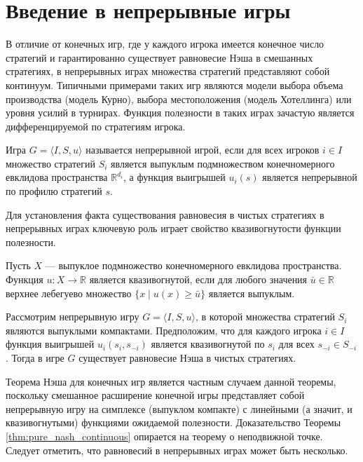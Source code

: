 \section{Введение в непрерывные игры}

В отличие от конечных игр, где у каждого игрока имеется конечное число стратегий и гарантированно существует равновесие Нэша в смешанных стратегиях, в непрерывных играх множества стратегий представляют собой континуум. Типичными примерами таких игр являются модели выбора объема производства (модель Курно), выбора местоположения (модель Хотеллинга) или уровня усилий в турнирах. Функция полезности в таких играх зачастую является дифференцируемой по стратегиям игрока.

\begin{definition}
Игра $G = \langle I, S, u \rangle$ называется непрерывной игрой, если для всех игроков $i \in I$ множество стратегий $S_i$ является выпуклым подмножеством конечномерного евклидова пространства $\mathbb{R}^{d_i}$, а функция выигрышей $u_i(s)$ является непрерывной по профилю стратегий $s$.
\end{definition}

Для установления факта существования равновесия в чистых стратегиях в непрерывных играх ключевую роль играет свойство квазивогнутости функции полезности.

\begin{definition}
Пусть $X$ — выпуклое подмножество конечномерного евклидова пространства. Функция $u : X \to \mathbb{R}$ является квазивогнутой, если для любого значения $\bar{u} \in \mathbb{R}$ верхнее лебегуево множество $\{x \mid u(x) \ge \bar{u}\}$ является выпуклым.
\end{definition}

\begin{theorem}\label{thm:pure_nash_continuous}
Рассмотрим непрерывную игру $G = \langle I, S, u \rangle$, в которой множества стратегий $S_i$ являются выпуклыми компактами. Предположим, что для каждого игрока $i \in I$ функция выигрышей $u_i(s_i, s_{-i})$ является квазивогнутой по $s_i$ для всех $s_{-i} \in S_{-i}$. Тогда в игре $G$ существует равновесие Нэша в чистых стратегиях.
\end{theorem}

Теорема Нэша для конечных игр является частным случаем данной теоремы, поскольку смешанное расширение конечной игры представляет собой непрерывную игру на симплексе (выпуклом компакте) с линейными (а значит, и квазивогнутыми) функциями ожидаемой полезности. Доказательство Теоремы \ref{thm:pure_nash_continuous} опирается на теорему о неподвижной точке. Следует отметить, что равновесий в непрерывных играх может быть несколько.

